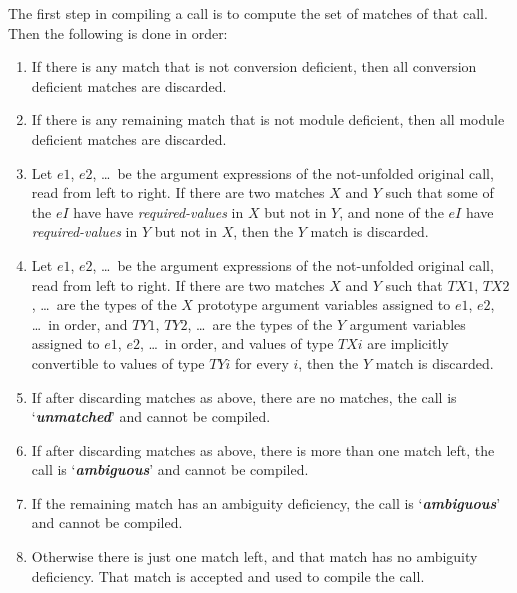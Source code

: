 \documentclass[12pt]{article}
\newcommand{\key}[1]{{\bf \em #1}\index{#1}}
\begin{document}
The first step in compiling a call is to compute the
set of matches of that call.  Then the following is done in order:

\begin{enumerate}

\item If there is any match that is not conversion deficient, then
all conversion deficient matches are discarded.

\item If there is any remaining match that is not module deficient, then
all module deficient matches are discarded.

\item\label{REQUIRED-ARGUMENTS-PREFERRED}
Let $e1$, $e2$, \ldots{}~be the argument expressions of
the not-unfolded original call, read from left to right.
If there are two matches $X$ and $Y$ such that
some of the $eI$ have
have {\em required-values} in $X$ but not in $Y$, and none of the $eI$
have {\em required-values} in $Y$ but not in $X$,
then the $Y$ match is discarded.

\item\label{MORE-RESTRICTIVE-ARGUMENT-TYPES-PREFERRED}
Let $e1$, $e2$, \ldots{}~be the argument expressions of
the not-unfolded original call, read from left to right.
If there are two matches $X$ and $Y$ such that
$TX1$, $TX2$, \ldots{}~are the types of the $X$ prototype argument
variables assigned to $e1$, $e2$, \ldots{}~in order, and
$TY1$, $TY2$, \ldots{}~are the types of the $Y$ argument
variables assigned to $e1$, $e2$, \ldots{}~in order,
and values of type
$TXi$ are implicitly convertible to values of type $TYi$ for
every $i$,
then the $Y$ match is discarded.

\item If after discarding matches as above, there are no matches,
the call is `\key{unmatched}' and cannot be compiled.

\item If after discarding matches as above, there is more than one
match left,
the call is `\key{ambiguous}' and cannot be compiled.

\item If the remaining match has
an ambiguity deficiency,
the call is `\key{ambiguous}' and cannot be compiled.

\item Otherwise there is just one match left, and that
match has no ambiguity deficiency.  That match
is accepted and used to compile the call.

\end{enumerate}
\end{document}
